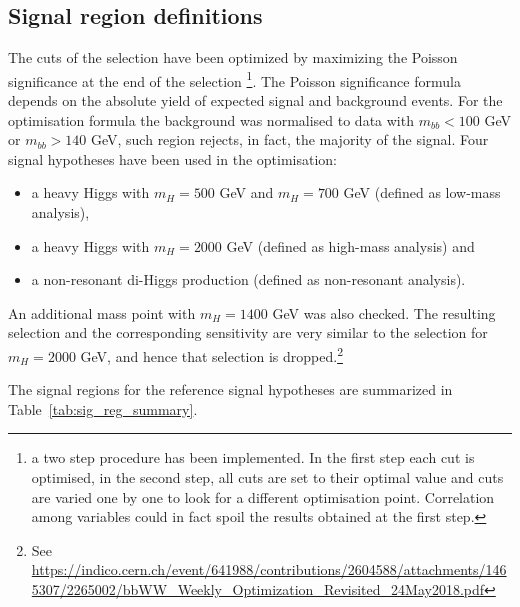 \subsection{Signal region definitions}
\label{subsec:SR}
The cuts of the selection have been optimized by maximizing the Poisson
significance at the end of the selection \footnote{a two step procedure has
been implemented. In the first step each cut is optimised, in the second step,
all cuts are set to their optimal value and cuts are varied one by one to
look for a different optimisation point. Correlation among variables 
could in fact spoil the results obtained at the first step.}. The Poisson
significance formula depends on the absolute yield of expected signal and
background events. For the optimisation formula the \ttbar background was
normalised to data with $m_{bb} < 100$ GeV or $m_{bb} > 140$ GeV, 
such region rejects, in fact, the majority of the signal. Four signal
hypotheses have been used in the optimisation:
\begin{itemize}
\item{ a heavy Higgs with $m_H = 500$ GeV and $m_H = 700$ GeV (defined as low-mass analysis)},
\item{ a heavy Higgs with $m_H = 2000$ GeV (defined as high-mass analysis) and}
\item{ a non-resonant di-Higgs production (defined as non-resonant analysis).}
\end{itemize}
An additional mass point with $m_H = 1400$ GeV was also checked. The resulting selection and the corresponding sensitivity are very similar to the selection for $m_H = 2000$ GeV, and hence that selection is dropped.{\footnote {See \url {https://indico.cern.ch/event/641988/contributions/2604588/attachments/1465307/2265002/bbWW_Weekly_Optimization_Revisited_24May2018.pdf}}} 

The signal regions for the  reference signal hypotheses are summarized in 
Table~\ref{tab:sig_reg_summary}.


